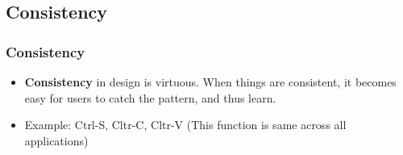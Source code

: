 \documentclass{beamer}
\begin{document}
%	


\subsection{Consistency}

\begin{frame}
\frametitle{Consistency}
\begin{itemize}
	\item \textbf{Consistency} in design is virtuous.  When things are consistent, it becomes easy for users to catch the pattern, and thus learn. 
	\item Example: Ctrl-S, Cltr-C, Cltr-V   (This function is same across all applications)
\end{itemize}
\end{frame}
\end{document}

